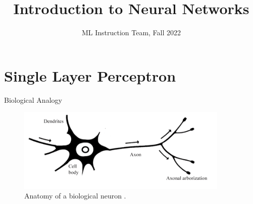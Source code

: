 \documentclass[compress,oilve,t]{beamer}
\title{Introduction to Neural Networks}
\author{ML Instruction Team, Fall 2022}
\institute[]{CE Department \newline  Sharif University of Technology}
\date[\today]{}
\begin{document}
	
\fontsize{9}{9}
\begin{frame}
	\titlepage
\end{frame}



\section{Single Layer Perceptron}
\begin{frame}{Biological Analogy}
	\begin{figure}[H]
		\centering
		\includegraphics[width=0.9\textwidth]{Figs/biological_neuron.png}
		\caption{Anatomy of a biological neuron \cite{biological-and-nn-neuron}.}
	\end{figure}
\end{frame}
\end{document}
